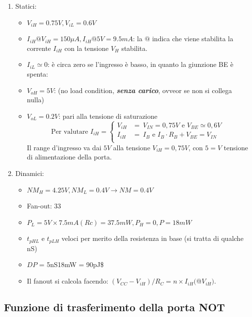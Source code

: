 \documentclass[
]{book}
\providecommand{\tightlist}{%
  \setlength{\itemsep}{0pt}\setlength{\parskip}{0pt}}
\begin{document}
\begin{enumerate}
\def\labelenumi{\arabic{enumi})}
\tightlist
\item
  Statici:

  \begin{itemize}
  \tightlist
  \item
    \(V_{iH} = 0.75V, V_{iL} = 0.6V\)
  \item
    \(I_{iH} @ V_{iH} = 150 \mu A, I_{iH} @ 5V = 9.5mA\): la \(@\)
    indica che viene stabilita la corrente \(I_{iH}\) con la tensione
    \(V_{H}\) stabilita.
  \item
    \(I_{iL} \simeq 0\): è circa zero se l'ingresso è basso, in quanto
    la giunzione BE è spenta:
  \item
    \(V_{oH} = 5V\): (no load condition, \textbf{\emph{senza carico}},
    ovveor se non si collega nulla)
  \item
    \(V_{oL} = 0.2V\): pari alla tensione di saturazione \[
     \text{Per valutare } I_{iH} = \left\{ \begin{array}{cl}
     V_{iH} & =\ V_{IN} = 0,75 V \text{ e } V_{BE}\simeq 0,6V\\
     I_{iH} & =\ I_{B} \text{ e } I_{B}\cdot R_{B}+V_{BE}=V_{IN}\\
     \end{array} \right.
     \] Il range d'ingresso va dai \(5V\) alla tensione
    \(V_{iH}=0,75V\), con \(5=V\) tensione di alimentazione della porta.
  \end{itemize}
\item
  Dinamici:

  \begin{itemize}
  \tightlist
  \item
    \(NM_{H} = 4.25V, NM_{L} = 0.4V \to NM = 0.4V\)
  \item
    Fan-out: 33
  \item
    \(P_{L} = 5V\times 7.5mA (Rc) = 37.5mW, P_{H} = 0, P =18mW\)
  \item
    \(t_{pHL}\) e \(t_{pLH}\) veloci per merito della resistenza in base
    (si tratta di qualche nS)
  \item
    \(DP\) = 5nS\times 18mW = 90pJ\$
  \item
    Il fanout si calcola facendo:
    \((V_{CC}-V_{iH})/R_{C}=n\times I_{iH}(\)@\(V_{iH})\).
  \end{itemize}
\end{enumerate}

\subsection{Funzione di trasferimento della porta
NOT}\label{funzione-di-trasferimento-della-porta-not}
\end{document}
